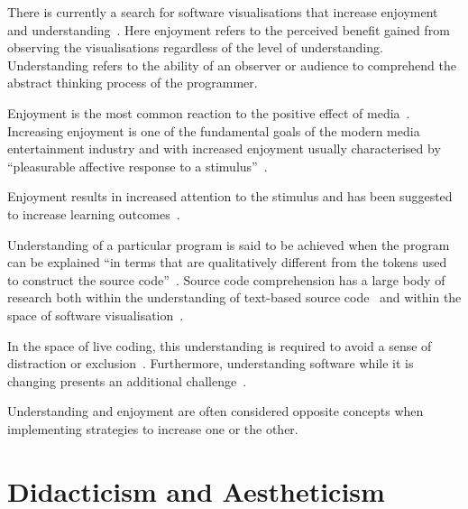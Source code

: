 
There is currently a search for software visualisations that increase enjoyment and understanding~\cite{McLean2010a}. Here enjoyment refers to the perceived benefit gained from observing the visualisations regardless of the level of understanding. Understanding refers to the ability of an observer or audience to comprehend the abstract thinking process of the programmer.

Enjoyment is the most common reaction to the positive effect of media~\cite{Vorderer2004}. Increasing enjoyment is one of the fundamental goals of the modern media entertainment industry and with increased enjoyment usually characterised by ``pleasurable affective response to a stimulus''~\cite{Brock2004}.

Enjoyment results in increased attention to the stimulus and has been suggested to increase learning outcomes~. \more

Understanding of a particular program is said to be achieved when the program can be explained ``in terms that are qualitatively different from the tokens used to construct the source code''~\cite{Biggerstaff1994}. Source code comprehension has a large body of research both within the understanding of text-based source code~ and within the space of software visualisation~\cite{Hosking2005}.

In the space of live coding, this understanding is required to avoid a sense of distraction or exclusion~\cite{McLean2010a}. Furthermore, understanding software while it is changing presents an additional challenge~\cite{Eisenbarth2003}.

Understanding and enjoyment are often considered opposite concepts when implementing strategies to increase one or the other. 

\section{Didacticism and Aestheticism}

